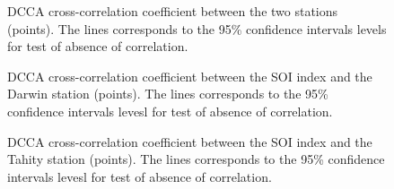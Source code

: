 \documentclass[onecolumn, preprint,aps,amsmath, amssymb, superscriptaddress]{revtex4}
\begin{document}
\begin{figure}
\caption{DCCA cross-correlation coefficient between the two stations (points). The lines corresponds to the 95\% confidence intervals levels for test of absence of correlation.}
\label{fig:rho_stations}
\end{figure}

\begin{figure}
\caption{DCCA cross-correlation coefficient between the SOI index and the Darwin station (points). The lines corresponds to the 95\% confidence intervals levesl for test of absence of correlation.}
\label{fig:rho_dar_soi}
\end{figure}

\begin{figure}
\caption{DCCA cross-correlation coefficient between the SOI index and the Tahity station (points). The lines corresponds to the 95\% confidence intervals levesl for test of absence of correlation. }
\label{fig:rho_tah_soi}
\end{figure}
\end{document}
